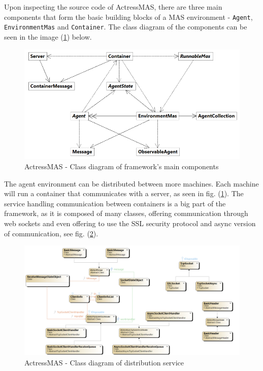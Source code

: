 \documentclass[main.tex]{subfiles}
\begin{document}
Upon inspecting the source code of ActressMAS, there are three main components that form the basic building 
blocks of a MAS environment - \texttt{Agent}, \texttt{EnvironmentMas} and \texttt{Container}.
The class diagram of the components can be seen in the image (\ref{actress-env}) below.

\begin{figure}[htbp]
    \centering
    \includegraphics[width=.9\textwidth]{actress-environment2.png}
    \caption{ActressMAS - Class diagram of framework's main components}
    \label{actress-env}
\end{figure}

The agent environment can be distributed between more machines. Each machine will run a container that communicates with a 
server, as seen in fig. (\ref{actress-env}). The service handling communication between containers is a big part of the 
framework, as it is composed of many classes, offering communication through web sockets and even offering to 
use the SSL security protocol and async version of communication, see fig. (\ref{actress-distr}).

\begin{figure}[htbp]
    \centering
    \includegraphics[width=.9\textwidth]{ClassDiagram-actress-containers.png}
    \caption{ActressMAS - Class diagram of distribution service}
    \label{actress-distr}
\end{figure}
\end{document}
